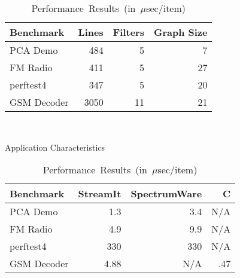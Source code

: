 \begin{table}[t]
\begin{minipage}{2.05in}
\centering
\scriptsize
\begin{tabular}{|l|r|r|r|} \hline
Benchmark & Lines & Filters & Graph Size\\
\hline \hline
PCA Demo & 484 & 5 & 7\\
\hline
FM Radio & 411 & 5 & 27\\
\hline
perftest4 & 347 & 5 & 20\\
\hline
GSM Decoder & 3050 & 11 & 21 \\
\hline
\end{tabular} \\
\vspace{6pt}
\caption{\protect\small Application Characteristics
\label{tab:benchmarks}}
\vspace{-24pt}
\end{minipage}
\hspace{0.2in}
\begin{minipage}{2.5in}
\centering
\scriptsize
\begin{tabular}{|l|r|r|r|} \hline
Benchmark & StreamIt & SpectrumWare & C \\
\hline \hline
PCA Demo & 1.3 & 3.4 & N/A\\
\hline
FM Radio & 4.9 & 9.9 & N/A\\
\hline
perftest4 & 330 & 330 & N/A\\
\hline
GSM Decoder & 4.88 & N/A & .47\\
\hline
\end{tabular} \\
\vspace{6pt}
\caption{\protect\small \mbox{Performance Results (in $\mu$sec/item)}
\label{tab:performance}}
\vspace{-24pt}
\end{minipage}
\end{table}



